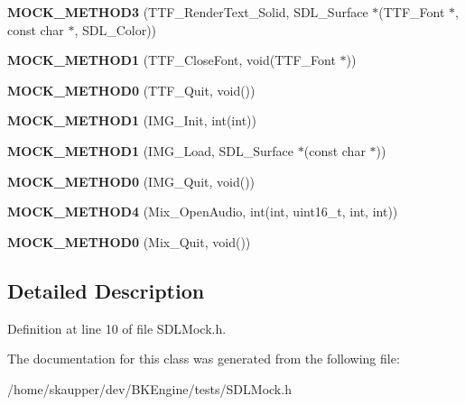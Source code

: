 \begin{DoxyCompactItemize}
{\bfseries M\+O\+C\+K\+\_\+\+M\+E\+T\+H\+O\+D3} (T\+T\+F\+\_\+\+Render\+Text\+\_\+\+Solid, S\+D\+L\+\_\+\+Surface $\ast$(T\+T\+F\+\_\+\+Font $\ast$, const char $\ast$, S\+D\+L\+\_\+\+Color))
\item 
\mbox{\label{classSDLMock_a22f101992bbdbd9130b32a357e07906d}} 
{\bfseries M\+O\+C\+K\+\_\+\+M\+E\+T\+H\+O\+D1} (T\+T\+F\+\_\+\+Close\+Font, void(T\+T\+F\+\_\+\+Font $\ast$))
\item 
\mbox{\label{classSDLMock_acaace20d5e817097c3edbc5c1a4b1f3d}} 
{\bfseries M\+O\+C\+K\+\_\+\+M\+E\+T\+H\+O\+D0} (T\+T\+F\+\_\+\+Quit, void())
\item 
\mbox{\label{classSDLMock_ae75ec568e235fa9757a16f04bc21362c}} 
{\bfseries M\+O\+C\+K\+\_\+\+M\+E\+T\+H\+O\+D1} (I\+M\+G\+\_\+\+Init, int(int))
\item 
\mbox{\label{classSDLMock_ab2c158ba13a0d6d7940952b8035c6a63}} 
{\bfseries M\+O\+C\+K\+\_\+\+M\+E\+T\+H\+O\+D1} (I\+M\+G\+\_\+\+Load, S\+D\+L\+\_\+\+Surface $\ast$(const char $\ast$))
\item 
\mbox{\label{classSDLMock_a634219e9f1b4a82d0c281377c6bc06c7}} 
{\bfseries M\+O\+C\+K\+\_\+\+M\+E\+T\+H\+O\+D0} (I\+M\+G\+\_\+\+Quit, void())
\item 
\mbox{\label{classSDLMock_a93c15996fd5209123c253b1747751a8b}} 
{\bfseries M\+O\+C\+K\+\_\+\+M\+E\+T\+H\+O\+D4} (Mix\+\_\+\+Open\+Audio, int(int, uint16\+\_\+t, int, int))
\item 
\mbox{\label{classSDLMock_a7d12dc6f716e903b1a4a45ddbf22497c}} 
{\bfseries M\+O\+C\+K\+\_\+\+M\+E\+T\+H\+O\+D0} (Mix\+\_\+\+Quit, void())
\end{DoxyCompactItemize}


\subsection{Detailed Description}


Definition at line 10 of file S\+D\+L\+Mock.\+h.



The documentation for this class was generated from the following file\+:\begin{DoxyCompactItemize}
\item 
/home/skaupper/dev/\+B\+K\+Engine/tests/S\+D\+L\+Mock.\+h\end{DoxyCompactItemize}
